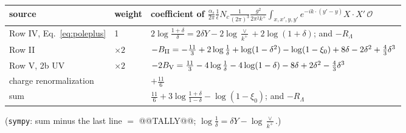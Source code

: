 \documentclass[10pt]{article}
\numberwithin{equation}{section}
\newcommand{\OO}{\mathcal O}
\newcommand{\pre}{\frac{1}{(2\pi)^3}\frac{g^2}{2\pi^2k^+}}
\begin{document}
\begin{table}[H]\centering\small
\renewcommand{\arraystretch}{1.3}
\begin{tabular}{@{}lll@{}}\toprule
source & weight & coefficient of $\frac{\alpha_s}{2\pi}\frac{1}{\bar\epsilon}N_c\pre\int_{x,x',y,y'}e^{-ik\cdot(y'-y)}X\cdot X'\,\OO$\\\midrule
Row IV, Eq.~\eqref{eq:poleplus} & 1 & $2\log\frac{1+\delta}{\delta}=2\delta Y-2\log\frac{\vee}{k^+}+2\log(1+\delta)$; and $-R_\Lambda$\\
Row II & $\times2$ & $-B_{\rm II}=-\frac{11}{3}+2\log\frac1\delta+\log(1-\delta^2)-\log(1-\xi_0)+8\delta-2\delta^2+\frac43\delta^3$\\
Row V, 2b UV & $\times2$ & $-2B_{\rm V}=\frac{11}{3}-4\log\frac1\delta-4\log(1-\delta)-8\delta+2\delta^2-\frac43\delta^3$\\
charge renormalization & & $+\frac{11}{6}$\\\midrule
sum & & $\frac{11}{6}+3\log\frac{1+\delta}{1-\delta}-\log(1-\xi_0)$; and $-R_\Lambda$\\\bottomrule
\end{tabular}
\end{table}
(\texttt{sympy}: sum minus the last line $=$ @@TALLY@@; $\log\frac1\delta=\delta Y-\log\frac{\vee}{k^+}$.)
\end{document}

